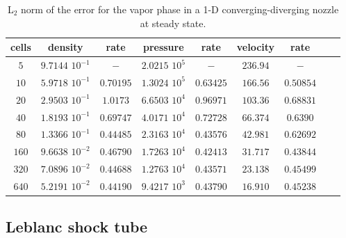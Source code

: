 \documentclass[preprint,10pt]{elsarticle}
\begin{document}
\begin{table}[H]
\begin{center}
 \caption{\label{tbl:l2_norm_vap} L$_2$ norm of the error for the vapor phase in a 1-D converging-diverging nozzle at steady state.}
 \begin{tabular}{|c|c|c|c|c|c|c|c|c|}
 \hline
cells & density             & rate      & pressure          & rate      & velocity & rate       \\ \hline
$5$   & $9.7144$ $10^{-1}$  & $-$       & $2.0215$ $10^{5}$ & $-$       & $236.94$ & $-$        \\ \hline
$10$  & $5.9718$ $10^{-1}$  & $0.70195$ & $1.3024$ $10^{5}$ & $0.63425$ & $166.56$ & $0.50854$  \\ \hline
$20$  & $2.9503$ $10^{-1}$  & $1.0173$  & $6.6503$ $10^{4}$ & $0.96971$ & $103.36$ & $0.68831$  \\ \hline
$40$  & $1.8193$ $10^{-1}$  & $0.69747$ & $4.0171$ $10^{4}$ & $0.72728$ & $66.374$ & $0.6390$   \\ \hline
$80$  & $1.3366$ $10^{-1}$  & $0.44485$ & $2.3163$ $10^{4}$ & $0.43576$ & $42.981$ & $0.62692$  \\ \hline
$160$ & $9.6638$ $10^{-2}$  & $0.46790$ & $1.7263$ $10^{4}$ & $0.42413$ & $31.717$ & $0.43844$  \\ \hline
$320$ & $7.0896$ $10^{-2}$  & $0.44688$ & $1.2763$ $10^{4}$ & $0.43571$ & $23.138$ & $0.45499$  \\ \hline
$640$ & $5.2191$ $10^{-2}$  & $0.44190$ & $9.4217$ $10^{3}$ & $0.43790$ & $16.910$ & $0.45238$  \\ \hline
\end{tabular}
\end{center}
\nonumber
\end{table}

\subsection{Leblanc shock tube} \label{sec:Leblanc}
\end{document}

